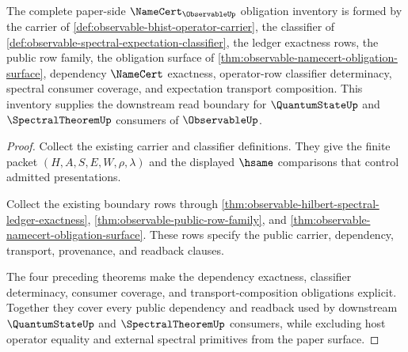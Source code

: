 \begin{theorem}
\label{thm:observable-namecert-obligation-surface-complete}
The complete paper-side $\NameCert_{\ObservableUp}$ obligation inventory is
formed by the carrier of \autoref{def:observable-bhist-operator-carrier}, the
classifier of \autoref{def:observable-spectral-expectation-classifier}, the
ledger exactness rows, the public row family, the obligation surface of
\autoref{thm:observable-namecert-obligation-surface}, dependency
$\NameCert$ exactness, operator-row classifier determinacy, spectral consumer
coverage, and expectation transport composition. This inventory supplies the
downstream read boundary for $\QuantumStateUp$ and $\SpectralTheoremUp$
consumers of $\ObservableUp$.
\end{theorem}
\begin{proof}
Collect the existing carrier and classifier definitions. They give the finite
packet $(H,A,S,E,W,\rho,\lambda)$ and the displayed $\hsame$ comparisons that
control admitted presentations.

Collect the existing boundary rows through
\autoref{thm:observable-hilbert-spectral-ledger-exactness},
\autoref{thm:observable-public-row-family}, and
\autoref{thm:observable-namecert-obligation-surface}. These rows specify the
public carrier, dependency, transport, provenance, and readback clauses.

The four preceding theorems make the dependency exactness, classifier
determinacy, consumer coverage, and transport-composition obligations explicit.
Together they cover every public dependency and readback used by downstream
$\QuantumStateUp$ and $\SpectralTheoremUp$ consumers, while excluding host
operator equality and external spectral primitives from the paper surface.
\end{proof}

